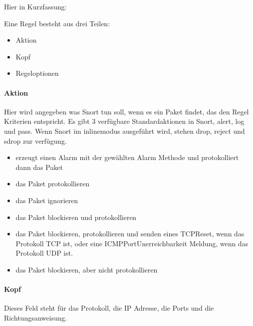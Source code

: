 \documentclass[letterpaper,10pt,ngerman]{sphinxmanual}
\begin{document}
Hier in Kurzfassung:

Eine Regel besteht aus drei Teilen:
\begin{itemize}
\item {} 
Aktion

\item {} 
Kopf

\item {} 
Regeloptionen

\end{itemize}


\paragraph{Aktion}
\label{\detokenize{ids:aktion}}
Hier wird angegeben was Snort tun soll, wenn es ein Paket findet, das den
Regel Kriterien entspricht. Es gibt 3 verfügbare Standardaktionen in Snort,
alert, log und pass. Wenn Snort im inline\sphinxhyphen{}modus ausgeführt wird, stehen drop,
reject und sdrop zur verfügung.
\begin{itemize}
\item {} 
 erzeugt einen Alarm mit der gewählten Alarm Methode und protokolliert dann das Paket

\item {} 
 das Paket protokollieren

\item {} 
 das Paket ignorieren

\item {} 
 das Paket blockieren und protokollieren

\item {} 
 das Paket blockieren, protokollieren und senden eines TCP\sphinxhyphen{}Reset, wenn das Protokoll TCP ist, oder eine ICMP\sphinxhyphen{}Port\sphinxhyphen{}Unerreichbarkeit Meldung, wenn das Protokoll UDP ist.

\item {} 
 das Paket blockieren, aber nicht protokollieren

\end{itemize}


\paragraph{Kopf}
\label{\detokenize{ids:kopf}}
Dieses Feld steht für das Protokoll, die IP Adresse, die Ports und die
Richtungsanweisung.
\end{document}
